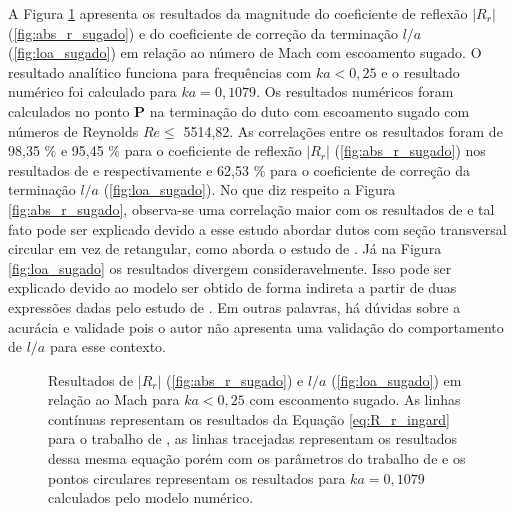 A Figura \ref{fig:resultados_sugado} apresenta os resultados da magnitude do coeficiente de reflexão $|R_{r}|$ (\ref{fig:abs_r_sugado}) e do coeficiente de correção da terminação $l/a$ (\ref{fig:loa_sugado}) em relação ao número de Mach com escoamento sugado. O resultado analítico funciona para frequências com $ka < 0,25$ e o resultado numérico foi calculado para $ka = 0,1079$. Os resultados numéricos foram calculados no ponto $\textbf{P}$ na terminação do duto com escoamento sugado com números de Reynolds $Re \leq$ 5514,82. As correlações entre os resultados foram de 98,35 \% e 95,45 \% para o coeficiente de reflexão $|R_{r}|$ (\ref{fig:abs_r_sugado}) nos resultados de  e  respectivamente e 62,53 \% para o coeficiente de correção da terminação $l/a$ (\ref{fig:loa_sugado}). No que diz respeito a Figura \ref{fig:abs_r_sugado}, observa-se uma correlação maior com os resultados de  e tal fato pode ser explicado devido a esse estudo abordar dutos com seção transversal circular em vez de retangular, como aborda o estudo de . Já na Figura \ref{fig:loa_sugado} os resultados divergem consideravelmente. Isso pode ser explicado devido ao modelo ser obtido de forma indireta a partir de duas expressões dadas pelo estudo de . Em outras palavras, há dúvidas sobre a acurácia e validade pois o autor não apresenta uma validação do comportamento de $l/a$ para esse contexto.

\begin{figure}[ht!]
\begin{subfigure}{\scaleA \textwidth}
  
\end{subfigure}%
\begin{subfigure}{\scaleA \textwidth}
  
\end{subfigure}
\caption[Resultados de $|R_{r}|$ e $l/a$ em relação ao número de Mach para baixas frequências com escoamento sugado]{Resultados de $|R_{r}|$ (\ref{fig:abs_r_sugado}) e $l/a$ (\ref{fig:loa_sugado}) em relação ao Mach para $ka < 0,25$ com escoamento sugado. As linhas contínuas representam os resultados da Equação \ref{eq:R_r_ingard} para o trabalho de , as linhas tracejadas representam os resultados dessa mesma equação porém com os parâmetros do trabalho de  e os pontos circulares representam os resultados para $ka = 0,1079$ calculados pelo modelo numérico.}
\label{fig:resultados_sugado}
\end{figure}

